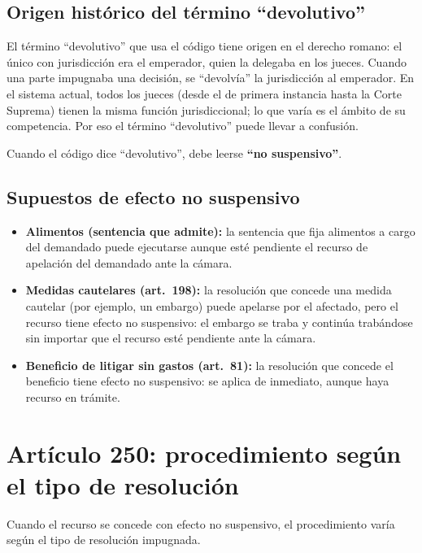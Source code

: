\documentclass[12pt,oneside]{book}
\begin{document}
\subsection{Origen histórico del término ``devolutivo''}

El término ``devolutivo'' que usa el código tiene origen en el derecho romano: el único con jurisdicción era el emperador, quien la delegaba en los jueces. Cuando una parte impugnaba una decisión, se ``devolvía'' la jurisdicción al emperador. En el sistema actual, todos los jueces (desde el de primera instancia hasta la Corte Suprema) tienen la misma función jurisdiccional; lo que varía es el ámbito de su competencia. Por eso el término ``devolutivo'' puede llevar a confusión.

\begin{important}
Cuando el código dice ``devolutivo'', debe leerse \textbf{``no suspensivo''}.
\end{important}

\subsection{Supuestos de efecto no suspensivo}

\begin{itemize}
    \item \textbf{Alimentos (sentencia que admite):} la sentencia que fija alimentos a cargo del demandado puede ejecutarse aunque esté pendiente el recurso de apelación del demandado ante la cámara.
    \item \textbf{Medidas cautelares (art.~198):} la resolución que concede una medida cautelar (por ejemplo, un embargo) puede apelarse por el afectado, pero el recurso tiene efecto no suspensivo: el embargo se traba y continúa trabándose sin importar que el recurso esté pendiente ante la cámara.
    \item \textbf{Beneficio de litigar sin gastos (art.~81):} la resolución que concede el beneficio tiene efecto no suspensivo: se aplica de inmediato, aunque haya recurso en trámite.
\end{itemize}

\section{Artículo 250: procedimiento según el tipo de resolución}

Cuando el recurso se concede con efecto no suspensivo, el procedimiento varía según el tipo de resolución impugnada.
\end{document}
